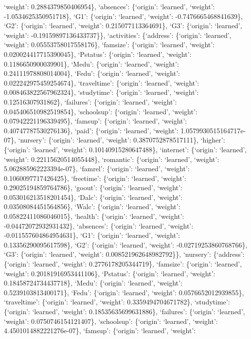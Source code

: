 \documentclass[
]{article}
\begin{document}
`weight': 0.2884379850406954\}, `absences': \{`origin': `learned',
`weight': -1.0534625350951718\}, `G1': \{`origin': `learned', `weight':
-0.7476665468841639\}, `G2': \{`origin': `learned', `weight':
0.215077113364691\}, `G3': \{`origin': `learned', `weight':
-0.19159897136433737\}\}, `activities': \{`address': \{`origin':
`learned', `weight': 0.05553758017558176\}, `famsize': \{`origin':
`learned', `weight': 0.020024417715390045\}, `Pstatus': \{`origin':
`learned', `weight': 0.1186650900039901\}, `Medu': \{`origin':
`learned', `weight': 0.24111978808014004\}, `Fedu': \{`origin':
`learned', `weight': 0.022242975459254674\}, `traveltime': \{`origin':
`learned', `weight': 0.008463822567962324\}, `studytime': \{`origin':
`learned', `weight': 0.12516307931862\}, `failures': \{`origin':
`learned', `weight': 0.045406510982519854\}, `schoolsup': \{`origin':
`learned', `weight': 0.07942221196339495\}, `famsup': \{`origin':
`learned', `weight': 0.40747787530276136\}, `paid': \{`origin':
`learned', `weight': 1.0579930515164717e-07\}, `nursery': \{`origin':
`learned', `weight': 0.3870752878517111\}, `higher': \{`origin':
`learned', `weight': 0.10140915280647488\}, `internet': \{`origin':
`learned', `weight': 0.22115620514055448\}, `romantic': \{`origin':
`learned', `weight': 5.062885962223394e-07\}, `famrel': \{`origin':
`learned', `weight': 0.1060097717426425\}, `freetime': \{`origin':
`learned', `weight': 0.29025194859764786\}, `goout': \{`origin':
`learned', `weight': 0.053016213518201454\}, `Dalc': \{`origin':
`learned', `weight': 0.03508084451564856\}, `Walc': \{`origin':
`learned', `weight': 0.05822411086046015\}, `health': \{`origin':
`learned', `weight': -0.04472072932931432\}, `absences': \{`origin':
`learned', `weight': -0.011557604864954631\}, `G1': \{`origin':
`learned', `weight': 0.13356290095617598\}, `G2': \{`origin': `learned',
`weight': -0.02719253860768766\}, `G3': \{`origin': `learned', `weight':
0.008521962648982792\}\}, `nursery': \{`address': \{`origin': `learned',
`weight': 0.2776178205344719\}, `famsize': \{`origin': `learned',
`weight': 0.20181916953441106\}, `Pstatus': \{`origin': `learned',
`weight': 0.18458724734437718\}, `Medu': \{`origin': `learned',
`weight': 0.5239103813400171\}, `Fedu': \{`origin': `learned', `weight':
0.0576652012939855\}, `traveltime': \{`origin': `learned', `weight':
0.3359494704671782\}, `studytime': \{`origin': `learned', `weight':
0.18535635699631886\}, `failures': \{`origin': `learned', `weight':
0.0750746154121407\}, `schoolsup': \{`origin': `learned', `weight':
4.4501014882221276e-07\}, `famsup': \{`origin': `learned', `weight':
\end{document}
